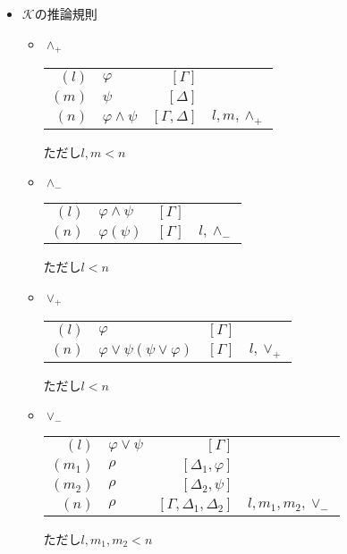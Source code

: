 \documentclass[10pt,b5paper,papersize,dvipdfmx]{jsbook}
\begin{document}
\begin{itemize}
\item $\mathcal K$の推論規則
\begin{itemize}
\item $\land_+$
\begin{table}[H]
\begin{center}
\begin{tabular}{rlrl}
$(l)$&$\varphi$&$[\Gamma]$& \\
$(m)$&$\psi$&$[\Delta]$& \\
$(n)$&$\varphi \land \psi$&$[\Gamma,\Delta]$&$l,m,\land_+$
\end{tabular}
\end{center}
\end{table}
ただし$l,m<n$
\item $\land_-$
\begin{table}[H]
\begin{center}
\begin{tabular}{rlrl}
$(l)$&$\varphi \land \psi$&$[\Gamma]$& \\
$(n)$&$\varphi (\psi)$&$[\Gamma]$&$l,\land_-$ \\
\end{tabular}
\end{center}
\end{table}
ただし$l<n$
\item $\lor_+$
\begin{table}[H]
\begin{center}
\begin{tabular}{rlrl}
$(l)$&$\varphi$&$[\Gamma]$& \\
$(n)$&$\varphi \lor \psi (\psi \lor \varphi)$&$[\Gamma]$&$l,\lor_+$
\end{tabular}
\end{center}
\end{table}
ただし$l<n$
\item $\lor_-$
\begin{table}[H]
\begin{center}
\begin{tabular}{rlrl}
$(l)$&$\varphi \lor \psi$&$[\Gamma]$& \\
$(m_1)$&$\rho$&$[\Delta_1,\varphi]$& \\
$(m_2)$&$\rho$&$[\Delta_2,\psi]$& \\
$(n)$&$\rho$&$[\Gamma,\Delta_1,\Delta_2]$&$l,m_1,m_2,\lor_-$
\end{tabular}
\end{center}
\end{table}
ただし$l,m_1,m_2<n$

\end{itemize}
\end{itemize}
\end{document}
